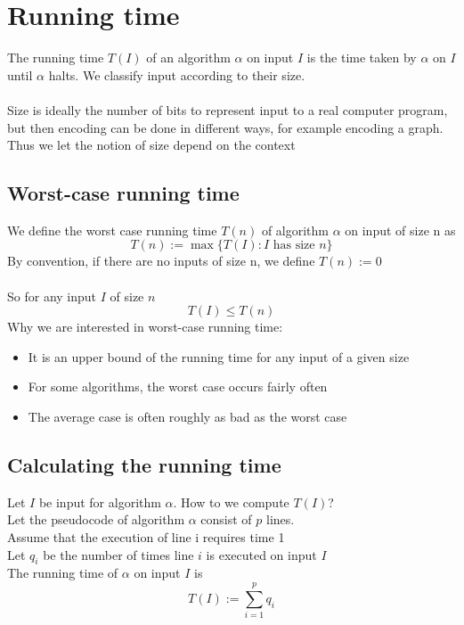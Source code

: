 \documentclass{article}[18pt]
\begin{document}
\section{Running time}
The running time $T(I)$ of an algorithm $\alpha$ on input $I$ is the time taken by $\alpha$ on $I$ until $\alpha$ halts. We classify input according to their size.\\
\\
Size is ideally the number of bits to represent input to a real computer program, but then encoding can be done in different ways, for example encoding a graph. Thus we let the notion of size depend on the context
\subsection{Worst-case running time}
We define the worst case running time $T(n)$ of algorithm $\alpha$ on input of size n as
\[
T(n):=\max \{T(I): I \text { has size } n\}
\]
By convention, if there are no inputs of size n, we define $T(n) := 0$\\
\\
So for any input $I$ of size $n$
$$T(I)\leqslant T(n)$$
Why we are interested in worst-case running time:
\begin{itemize}
	\item It is an upper bound of the running time for any input of a given size
	\item For some algorithms, the worst case occurs fairly often
	\item The average case is often roughly as bad as the worst case
\end{itemize}
\subsection{Calculating the running time}
Let $I$ be input for algorithm $\alpha$. How to we compute $T(I)$?\\
Let the pseudocode of algorithm $\alpha$ consist of $p$ lines.\\
Assume that the execution of line i requires time 1\\
Let $q_i$ be the number of times line $i$ is executed on input $I$\\
The running time of $\alpha$ on input $I$ is
\[
T(I):=\sum_{i=1}^{p} q_{i}
\]
\end{document}
